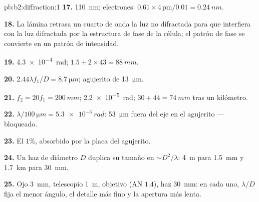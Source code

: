 \begin{solution}{pb:b2:diffraction:1}
\textbf{17.} \qty{110}{nm}; electrones: $0.61 \times 4\,\text{pm}/0.01 = \qty{0.24}{nm}$.

\textbf{18.} La lámina retrasa un cuarto de onda la luz no difractada
para que interfiera con la luz difractada por la estructura de fase de la
célula; el patrón de fase se convierte en un patrón de intensidad.

\textbf{19.} \qty{4.3e-4}{rad}; $1.5 + 2 \times 43 = \qty{88}{mm}$.

\textbf{20.} $2.44\lambda f_1/D = \qty{8.7}{\micro m}$; agujerito de \qty{13}{\micro m}.

\textbf{21.} $f_2 = 20f_1 = \qty{200}{mm}$; \qty{2.2e-5}{rad}; $30 + 44 = \qty{74}{mm}$ tras un
kilómetro.

\textbf{22.} $\lambda/\qty{100}{\micro m} = \qty{5.3e-3}{rad}$: \qty{53}{\micro m} fuera del eje en el
agujerito --- bloqueado.

\textbf{23.} El $1\%$, absorbido por la placa del agujerito.

\textbf{24.} Un haz de diámetro $D$ duplica su tamaño en $\sim D^2/\lambda$: \qty{4}{m} para
\qty{1.5}{mm} y \qty{1.7}{km} para \qty{30}{mm}.

\textbf{25.} Ojo \qty{3}{mm}, telescopio \qty{1}{m}, objetivo (AN $1.4$), haz
\qty{30}{mm}: en cada uno, $\lambda/D$ fija el menor ángulo, el detalle más fino y
la apertura más lenta.
\end{solution}
